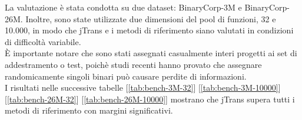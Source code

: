 \documentclass[12pt,a4paper,openright,twoside]{report}
\begin{document}
La valutazione è stata condotta su due dataset: BinaryCorp-3M e BinaryCorp-26M. Inoltre, sono state utilizzate due dimensioni del pool di funzioni, 32 e 10.000, in modo che jTrans e i metodi di riferimento siano valutati in condizioni di difficoltà variabile.\\
È importante notare che sono stati assegnati casualmente interi progetti ai set di addestramento o test, poichè studi recenti hanno provato che assegnare randomicamente singoli binari può causare perdite di informazioni.\\
\newpage
I risultati nelle successive tabelle [\ref{tab:bench-3M-32}] [\ref{tab:bench-3M-10000}] [\ref{tab:bench-26M-32}] [\ref{tab:bench-26M-10000}] mostrano che jTrans supera tutti i metodi di riferimento con margini significativi. 

\renewcommand\arraystretch{0.9}
\end{document}

